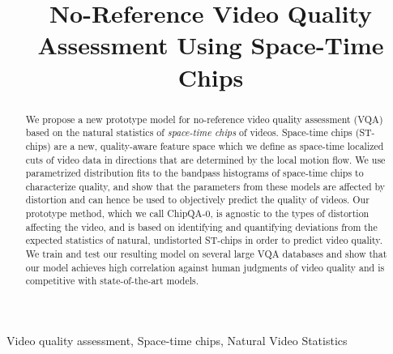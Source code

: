 \documentclass[conference]{IEEEtran}
\begin{document}
\title{No-Reference Video Quality Assessment Using Space-Time Chips}

\author{
}

\IEEEoverridecommandlockouts
{}

\maketitle
\begingroup\renewcommand\thefootnote{\textsection}
\endgroup

\begin{abstract}
We propose a new prototype model for no-reference video quality assessment (VQA) based on the natural statistics of \textit{space-time chips} of videos. Space-time chips (ST-chips) are a new, quality-aware feature space which we define as space-time localized cuts of video data in directions that are determined by the local motion flow. We use parametrized distribution fits to the bandpass histograms of space-time chips to characterize quality, and show that the parameters from these models are affected by distortion and can hence be used to objectively predict the quality of videos. Our prototype method, which we call ChipQA-0, is agnostic to the types of distortion affecting the video, and is based on identifying and quantifying deviations from the expected statistics of natural, undistorted ST-chips in order to predict video quality. We train and test our resulting model on several large VQA databases and show that our model achieves high correlation against human judgments of video quality and is competitive with state-of-the-art models. 
\end{abstract}

\begin{IEEEkeywords}
Video quality assessment, Space-time chips, Natural Video Statistics
\end{IEEEkeywords}
\end{document}
